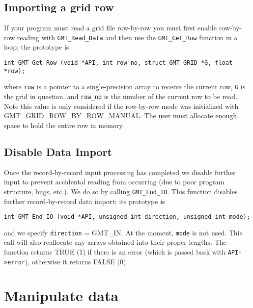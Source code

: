 \documentclass[11pt]{report}
\begin{document}
\subsection{Importing a grid row}

If your program must read a grid file row-by-row you must first enable row-by-row
reading with \texttt{GMT\_Read\_Data} and then use the \texttt{GMT\_Get\_Row} function in a loop;
the prototype is

\begin{verbatim}
int GMT_Get_Row (void *API, int row_no, struct GMT_GRID *G, float *row);
\end{verbatim}
where \texttt{row} is a pointer to a single-precision array to receive the current row,
\texttt{G} is the grid in question, and \texttt{row\_no} is the number of the current
row to be read.  Note this value is only considered if the row-by-row mode was
initialized with GMT\_GRID\_ROW\_BY\_ROW\_MANUAL.  The user must allocate enough
space to hold the entire row in memory. 

\subsection{Disable Data Import}

Once the record-by-record input processing has completed we disable further input to prevent accidental
reading from occurring (due to poor program structure, bugs, etc.).  We do so by calling \texttt{GMT\_End\_IO}.  This
function disables further record-by-record data import; its prototype is

\begin{verbatim}
int GMT_End_IO (void *API, unsigned int direction, unsigned int mode);
\end{verbatim}

\noindent
and we specify \texttt{direction} = GMT\_IN.  At the moment, \texttt{mode} is not used.  This call
will also reallocate any arrays obtained into their proper lengths.
The function returns TRUE (1) if there is an error (which is passed back with \texttt{API->error}),
otherwise it returns FALSE (0).

\section{Manipulate data}
\label{sec:manipulate}
\end{document}
